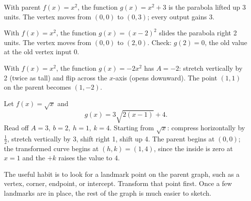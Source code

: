 \documentclass[12pt]{book}
\begin{document}
\begin{example}
With parent $f(x)=x^2$, the function $g(x)=x^2+3$ is the parabola lifted up 3
units. The vertex moves from $(0,0)$ to $(0,3)$; every output gains 3.
\end{example}

\begin{example}
With $f(x)=x^2$, the function $g(x)=(x-2)^2$ slides the parabola right 2 units. The
vertex moves from $(0,0)$ to $(2,0)$. Check: $g(2)=0$, the old value at the old
vertex input $0$.
\end{example}

\begin{example}
With $f(x)=x^2$, the function $g(x)=-2x^2$ has $A=-2$: stretch vertically by 2
(twice as tall) and flip across the $x$-axis (opens downward). The point $(1,1)$ on
the parent becomes $(1,-2)$.
\end{example}

\begin{example}
Let $f(x)=\sqrt{x}$ and
\[
g(x)=3\sqrt{2(x-1)}+4.
\]
Read off $A=3,\ b=2,\ h=1,\ k=4$. Starting from $\sqrt{x}$: compress horizontally by
$\tfrac12$, stretch vertically by 3, shift right 1, shift up 4. The parent begins at
$(0,0)$; the transformed curve begins at $(h,k)=(1,4)$, since the inside is zero at
$x=1$ and the $+k$ raises the value to $4$.
\end{example}

The useful habit is to look for a landmark point on the parent graph, such as a
vertex, corner, endpoint, or intercept. Transform that point first. Once a few
landmarks are in place, the rest of the graph is much easier to sketch.

\begin{center}
\end{center}
\end{document}

